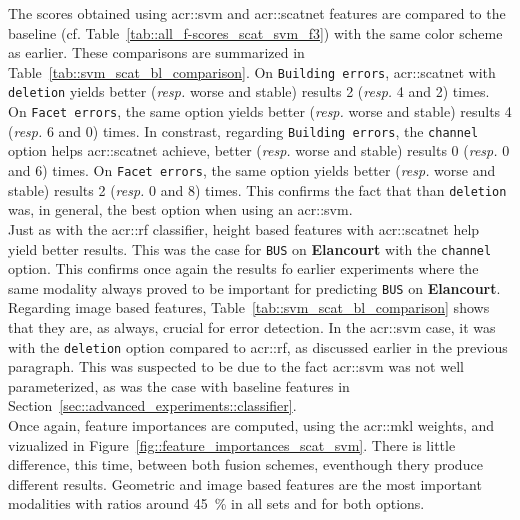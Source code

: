             The scores obtained using \gls{acr::svm} and \gls{acr::scatnet} features are compared to the baseline (cf. Table~\ref{tab::all_f-scores_scat_svm_f3}) with the same color scheme as earlier.
            These comparisons are summarized in Table~\ref{tab::svm_scat_bl_comparison}.
            On \texttt{Building errors}, \gls{acr::scatnet} with \texttt{deletion} yields better (\textit{resp.} worse and stable) results 2 (\textit{resp.} 4 and 2) times.
            On \texttt{Facet errors}, the same option yields better (\textit{resp.} worse and stable) results 4 (\textit{resp.} 6 and 0) times.
            In constrast, regarding \texttt{Building errors}, the \texttt{channel} option helps \gls{acr::scatnet} achieve, better (\textit{resp.} worse and stable) results 0 (\textit{resp.} 0 and 6) times.
            On \texttt{Facet errors}, the same option yields better (\textit{resp.} worse and stable) results 2 (\textit{resp.} 0 and 8) times.
            This confirms the fact that than \texttt{deletion} was, in general, the best option when using an \gls{acr::svm}.\\

            Just as with the \gls{acr::rf} classifier, height based features with \gls{acr::scatnet} help yield better results.
            This was the case for \texttt{BUS} on \textbf{Elancourt} with the \texttt{channel} option.
            This confirms once again the results fo earlier experiments where the same modality always proved to be important for predicting \texttt{BUS} on \textbf{Elancourt}.
            Regarding image based features, Table~\ref{tab::svm_scat_bl_comparison} shows that they are, as always, crucial for error detection.
            In the \gls{acr::svm} case, it was with the \texttt{deletion} option compared to \gls{acr::rf}, as discussed earlier in the previous paragraph.
            This was suspected to be due to the fact \gls{acr::svm} was not well parameterized, as was the case with baseline features in Section~\ref{sec::advanced_experiments::classifier}.\\

            Once again, feature importances are computed, using the \gls{acr::mkl} weights, and vizualized in Figure~\ref{fig::feature_importances_scat_svm}.
            There is little difference, this time, between both fusion schemes, eventhough thery produce different results.
            Geometric and image based features are the most important modalities with ratios around \SI{45}{\percent} in all sets and for both options.\\

